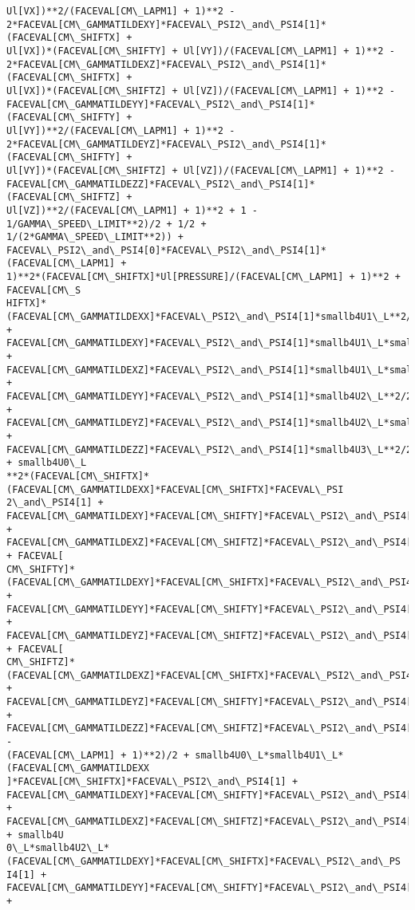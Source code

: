 \documentclass[landscape,letterpaper,10pt,english]{article}
\begin{document}
\begin{Verbatim}[commandchars=\\\{\}]
Ul[VX])**2/(FACEVAL[CM\_LAPM1] + 1)**2 -
2*FACEVAL[CM\_GAMMATILDEXY]*FACEVAL\_PSI2\_and\_PSI4[1]*(FACEVAL[CM\_SHIFTX] +
Ul[VX])*(FACEVAL[CM\_SHIFTY] + Ul[VY])/(FACEVAL[CM\_LAPM1] + 1)**2 -
2*FACEVAL[CM\_GAMMATILDEXZ]*FACEVAL\_PSI2\_and\_PSI4[1]*(FACEVAL[CM\_SHIFTX] +
Ul[VX])*(FACEVAL[CM\_SHIFTZ] + Ul[VZ])/(FACEVAL[CM\_LAPM1] + 1)**2 -
FACEVAL[CM\_GAMMATILDEYY]*FACEVAL\_PSI2\_and\_PSI4[1]*(FACEVAL[CM\_SHIFTY] +
Ul[VY])**2/(FACEVAL[CM\_LAPM1] + 1)**2 -
2*FACEVAL[CM\_GAMMATILDEYZ]*FACEVAL\_PSI2\_and\_PSI4[1]*(FACEVAL[CM\_SHIFTY] +
Ul[VY])*(FACEVAL[CM\_SHIFTZ] + Ul[VZ])/(FACEVAL[CM\_LAPM1] + 1)**2 -
FACEVAL[CM\_GAMMATILDEZZ]*FACEVAL\_PSI2\_and\_PSI4[1]*(FACEVAL[CM\_SHIFTZ] +
Ul[VZ])**2/(FACEVAL[CM\_LAPM1] + 1)**2 + 1 - 1/GAMMA\_SPEED\_LIMIT**2)/2 + 1/2 +
1/(2*GAMMA\_SPEED\_LIMIT**2)) +
FACEVAL\_PSI2\_and\_PSI4[0]*FACEVAL\_PSI2\_and\_PSI4[1]*(FACEVAL[CM\_LAPM1] +
1)**2*(FACEVAL[CM\_SHIFTX]*Ul[PRESSURE]/(FACEVAL[CM\_LAPM1] + 1)**2 + FACEVAL[CM\_S
HIFTX]*(FACEVAL[CM\_GAMMATILDEXX]*FACEVAL\_PSI2\_and\_PSI4[1]*smallb4U1\_L**2/2 +
FACEVAL[CM\_GAMMATILDEXY]*FACEVAL\_PSI2\_and\_PSI4[1]*smallb4U1\_L*smallb4U2\_L +
FACEVAL[CM\_GAMMATILDEXZ]*FACEVAL\_PSI2\_and\_PSI4[1]*smallb4U1\_L*smallb4U3\_L +
FACEVAL[CM\_GAMMATILDEYY]*FACEVAL\_PSI2\_and\_PSI4[1]*smallb4U2\_L**2/2 +
FACEVAL[CM\_GAMMATILDEYZ]*FACEVAL\_PSI2\_and\_PSI4[1]*smallb4U2\_L*smallb4U3\_L +
FACEVAL[CM\_GAMMATILDEZZ]*FACEVAL\_PSI2\_and\_PSI4[1]*smallb4U3\_L**2/2 + smallb4U0\_L
**2*(FACEVAL[CM\_SHIFTX]*(FACEVAL[CM\_GAMMATILDEXX]*FACEVAL[CM\_SHIFTX]*FACEVAL\_PSI
2\_and\_PSI4[1] +
FACEVAL[CM\_GAMMATILDEXY]*FACEVAL[CM\_SHIFTY]*FACEVAL\_PSI2\_and\_PSI4[1] +
FACEVAL[CM\_GAMMATILDEXZ]*FACEVAL[CM\_SHIFTZ]*FACEVAL\_PSI2\_and\_PSI4[1]) + FACEVAL[
CM\_SHIFTY]*(FACEVAL[CM\_GAMMATILDEXY]*FACEVAL[CM\_SHIFTX]*FACEVAL\_PSI2\_and\_PSI4[1]
+ FACEVAL[CM\_GAMMATILDEYY]*FACEVAL[CM\_SHIFTY]*FACEVAL\_PSI2\_and\_PSI4[1] +
FACEVAL[CM\_GAMMATILDEYZ]*FACEVAL[CM\_SHIFTZ]*FACEVAL\_PSI2\_and\_PSI4[1]) + FACEVAL[
CM\_SHIFTZ]*(FACEVAL[CM\_GAMMATILDEXZ]*FACEVAL[CM\_SHIFTX]*FACEVAL\_PSI2\_and\_PSI4[1]
+ FACEVAL[CM\_GAMMATILDEYZ]*FACEVAL[CM\_SHIFTY]*FACEVAL\_PSI2\_and\_PSI4[1] +
FACEVAL[CM\_GAMMATILDEZZ]*FACEVAL[CM\_SHIFTZ]*FACEVAL\_PSI2\_and\_PSI4[1]) -
(FACEVAL[CM\_LAPM1] + 1)**2)/2 + smallb4U0\_L*smallb4U1\_L*(FACEVAL[CM\_GAMMATILDEXX
]*FACEVAL[CM\_SHIFTX]*FACEVAL\_PSI2\_and\_PSI4[1] +
FACEVAL[CM\_GAMMATILDEXY]*FACEVAL[CM\_SHIFTY]*FACEVAL\_PSI2\_and\_PSI4[1] +
FACEVAL[CM\_GAMMATILDEXZ]*FACEVAL[CM\_SHIFTZ]*FACEVAL\_PSI2\_and\_PSI4[1]) + smallb4U
0\_L*smallb4U2\_L*(FACEVAL[CM\_GAMMATILDEXY]*FACEVAL[CM\_SHIFTX]*FACEVAL\_PSI2\_and\_PS
I4[1] + FACEVAL[CM\_GAMMATILDEYY]*FACEVAL[CM\_SHIFTY]*FACEVAL\_PSI2\_and\_PSI4[1] +

\end{Verbatim}
\end{document}
